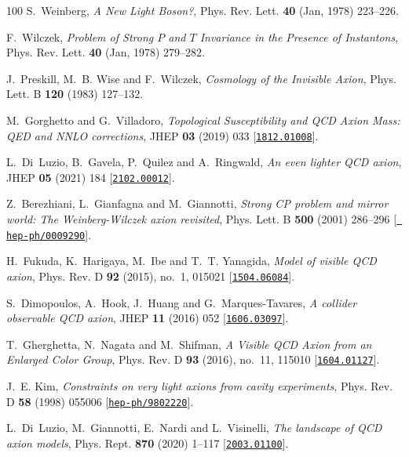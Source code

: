\begin{thebibliography}{100}
S.~Weinberg,  {\em A New Light Boson?}, Phys. Rev. Lett. {\bf 40} (Jan, 1978)
  223--226.

F.~Wilczek,  {\em Problem of Strong $P$ and $T$ Invariance in the Presence of
  Instantons}, Phys. Rev. Lett. {\bf 40} (Jan, 1978) 279--282.

J.~Preskill, M.~B. Wise and F.~Wilczek,  {\em {Cosmology of the Invisible
  Axion}}, Phys. Lett. B {\bf 120} (1983) 127--132.

M.~Gorghetto and G.~Villadoro,  {\em {Topological Susceptibility and QCD Axion
  Mass: QED and NNLO corrections}}, JHEP {\bf 03} (2019) 033
  [\href{http://www.arXiv.org/abs/1812.01008}{{\tt 1812.01008}}].

L.~Di~Luzio, B.~Gavela, P.~Quilez and A.~Ringwald,  {\em {An even lighter QCD
  axion}}, JHEP {\bf 05} (2021) 184
  [\href{http://www.arXiv.org/abs/2102.00012}{{\tt 2102.00012}}].

Z.~Berezhiani, L.~Gianfagna and M.~Giannotti,  {\em {Strong CP problem and
  mirror world: The Weinberg-Wilczek axion revisited}}, Phys. Lett. B {\bf 500}
  (2001) 286--296 [\href{http://www.arXiv.org/abs/hep-ph/0009290}{{\tt
  hep-ph/0009290}}].

H.~Fukuda, K.~Harigaya, M.~Ibe and T.~T. Yanagida,  {\em {Model of visible QCD
  axion}}, Phys. Rev. D {\bf 92} (2015), no.~1, 015021
  [\href{http://www.arXiv.org/abs/1504.06084}{{\tt 1504.06084}}].

S.~Dimopoulos, A.~Hook, J.~Huang and G.~Marques-Tavares,  {\em {A collider
  observable QCD axion}}, JHEP {\bf 11} (2016) 052
  [\href{http://www.arXiv.org/abs/1606.03097}{{\tt 1606.03097}}].

T.~Gherghetta, N.~Nagata and M.~Shifman,  {\em {A Visible QCD Axion from an
  Enlarged Color Group}}, Phys. Rev. D {\bf 93} (2016), no.~11, 115010
  [\href{http://www.arXiv.org/abs/1604.01127}{{\tt 1604.01127}}].

J.~E. Kim,  {\em {Constraints on very light axions from cavity experiments}},
  Phys. Rev. D {\bf 58} (1998) 055006
  [\href{http://www.arXiv.org/abs/hep-ph/9802220}{{\tt hep-ph/9802220}}].

L.~Di~Luzio, M.~Giannotti, E.~Nardi and L.~Visinelli,  {\em {The landscape of
  QCD axion models}}, Phys. Rept. {\bf 870} (2020) 1--117
  [\href{http://www.arXiv.org/abs/2003.01100}{{\tt 2003.01100}}].


\end{thebibliography}
